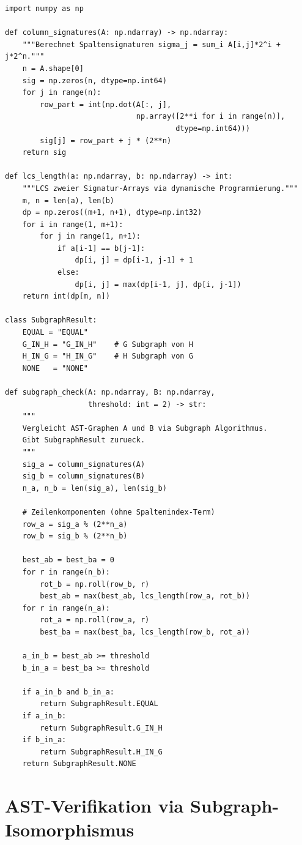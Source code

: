 ﻿\documentclass[a4paper,12pt]{article}
\theoremstyle{definition}
\begin{document}
\begin{lstlisting}[style=pystyle,
    caption={Subgraph Algorithmus: Signaturberechnung und LCS-Vergleich}]
import numpy as np

def column_signatures(A: np.ndarray) -> np.ndarray:
    """Berechnet Spaltensignaturen sigma_j = sum_i A[i,j]*2^i + j*2^n."""
    n = A.shape[0]
    sig = np.zeros(n, dtype=np.int64)
    for j in range(n):
        row_part = int(np.dot(A[:, j],
                              np.array([2**i for i in range(n)],
                                       dtype=np.int64)))
        sig[j] = row_part + j * (2**n)
    return sig

def lcs_length(a: np.ndarray, b: np.ndarray) -> int:
    """LCS zweier Signatur-Arrays via dynamische Programmierung."""
    m, n = len(a), len(b)
    dp = np.zeros((m+1, n+1), dtype=np.int32)
    for i in range(1, m+1):
        for j in range(1, n+1):
            if a[i-1] == b[j-1]:
                dp[i, j] = dp[i-1, j-1] + 1
            else:
                dp[i, j] = max(dp[i-1, j], dp[i, j-1])
    return int(dp[m, n])

class SubgraphResult:
    EQUAL = "EQUAL"
    G_IN_H = "G_IN_H"    # G Subgraph von H
    H_IN_G = "H_IN_G"    # H Subgraph von G
    NONE   = "NONE"

def subgraph_check(A: np.ndarray, B: np.ndarray,
                   threshold: int = 2) -> str:
    """
    Vergleicht AST-Graphen A und B via Subgraph Algorithmus.
    Gibt SubgraphResult zurueck.
    """
    sig_a = column_signatures(A)
    sig_b = column_signatures(B)
    n_a, n_b = len(sig_a), len(sig_b)

    # Zeilenkomponenten (ohne Spaltenindex-Term)
    row_a = sig_a % (2**n_a)
    row_b = sig_b % (2**n_b)

    best_ab = best_ba = 0
    for r in range(n_b):
        rot_b = np.roll(row_b, r)
        best_ab = max(best_ab, lcs_length(row_a, rot_b))
    for r in range(n_a):
        rot_a = np.roll(row_a, r)
        best_ba = max(best_ba, lcs_length(row_b, rot_a))

    a_in_b = best_ab >= threshold
    b_in_a = best_ba >= threshold

    if a_in_b and b_in_a:
        return SubgraphResult.EQUAL
    if a_in_b:
        return SubgraphResult.G_IN_H
    if b_in_a:
        return SubgraphResult.H_IN_G
    return SubgraphResult.NONE
\end{lstlisting}

\section{AST-Verifikation via Subgraph-Isomorphismus}
\label{sec:verif}
\end{document}
